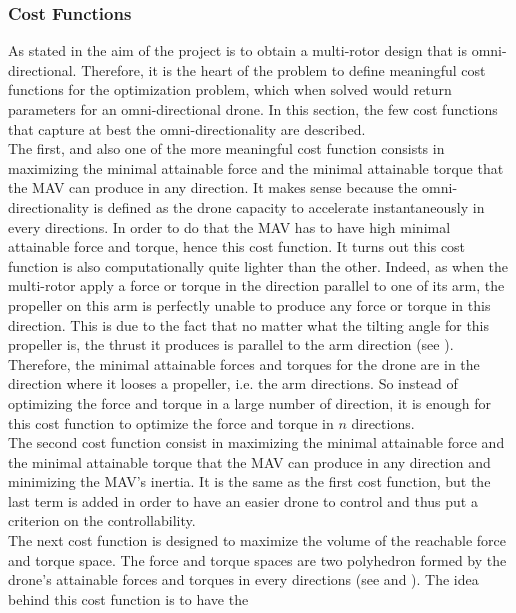 \subsubsection{Cost Functions}
\label{sec:cost_functions}
As stated in  the aim of the project is to obtain a multi-rotor
design that is omni-directional. Therefore, it is the heart of the problem to
define meaningful cost functions for the optimization problem, which when
solved would return parameters for an omni-directional drone. In this section,
the few cost functions that capture at best the omni-directionality are described.\\
The first, and also one of the more meaningful cost function consists in maximizing
the minimal attainable force and the minimal attainable torque that the MAV can
produce in any direction. It makes sense because the
omni-directionality is defined as the drone capacity to accelerate instantaneously
in every directions. In order to do that the MAV has to have high minimal attainable
force and torque, hence this cost function. It turns out this cost function is also
computationally quite lighter than the other. Indeed, as when the multi-rotor apply a
force or torque in the direction parallel to one of its arm, the propeller on this arm
is perfectly unable to produce any force or torque in this direction. This is due to
the fact that no matter what the tilting angle for this propeller is, the thrust it
produces is parallel to the arm direction (see ). Therefore,
the minimal attainable forces and torques for the drone are in the direction where
it looses a propeller, i.e. the arm directions. So instead of optimizing the force
and torque in a large number of direction, it is enough for this cost function to
optimize the force and torque in $n$ directions.\\
The second cost function consist in maximizing the minimal attainable force
and the minimal attainable torque that the MAV can produce in any direction
and minimizing the MAV’s inertia. It is the same as the first cost function, but
the last term is added in order to have an easier drone to control and thus put
a criterion on the controllability.\\
The next cost function is designed to maximize the volume of the reachable
force and torque space. The force and torque spaces are two polyhedron formed
by the drone’s attainable forces and torques in every directions (see 
and ). The idea behind this cost function is to have the
